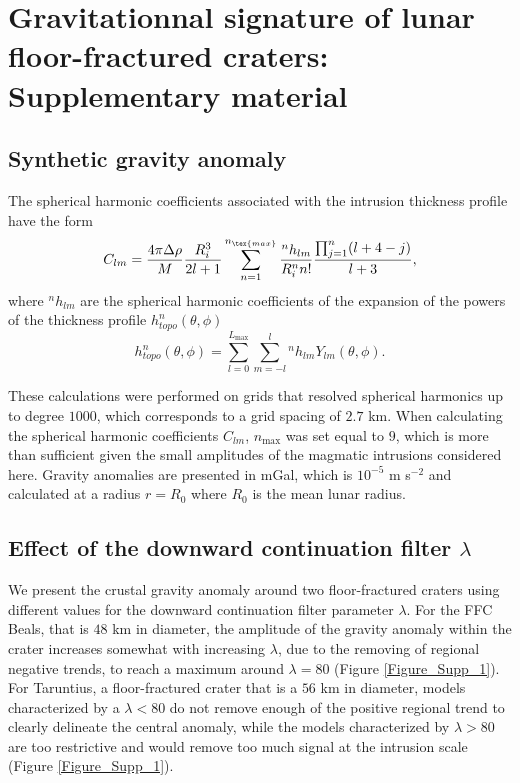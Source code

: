 \chapter{Gravitationnal  signature of  lunar floor-fractured  craters:
  Supplementary material}
\label{C6-chap:A5}

\section{Synthetic gravity anomaly}

The  spherical harmonic  coefficients  associated  with the  intrusion
thickness profile have the form
\begin{equation}
  C_{lm}=\frac{4\pi \Delta \rho}{M}\frac{R_i^3}{2l +1}\sum^{n_{\tex{max}}}_{n=1}\frac{^nh_{lm}}{R_i^n n!}\frac{\prod^n_{j=1}(l+4-j)}{l+3},
\end{equation}
where  $^nh_{lm}$  are  the  spherical harmonic  coefficients  of  the
expansion    of    the    powers     of    the    thickness    profile
$h_{topo}^n(\theta,\phi)$
\begin{equation}
  h^n_{topo}(\theta,\phi)= \sum_{l=0}^{L_{\text{max}}}\sum_{m=-l}^{l}{^n}h_{lm}Y_{lm}(\theta,\phi).
\end{equation}

These  calculations were  performed on  grids that  resolved spherical
harmonics up to degree $1000$, which  corresponds to a grid spacing of
$2.7$  km.   When  calculating  the  spherical  harmonic  coefficients
$C_{lm}$, $n_{\text{max}}$  was set equal  to $9$, which is  more than
sufficient  given  the small  amplitudes  of  the magmatic  intrusions
considered here.  Gravity anomalies  are presented  in mGal,  which is
$10^{-5}$ m s$^{-2}$ and calculated at a radius $r=R_0$ where $R_0$ is
the mean lunar radius.

\section{Effect of the downward continuation filter $\lambda$}
  
We  present the  crustal  gravity anomaly  around two  floor-fractured
craters using  different values  for the downward  continuation filter
parameter $\lambda$.  For the FFC Beals,  that is $48$ km in diameter,
the  amplitude of  the  gravity anomaly  within  the crater  increases
somewhat with  increasing $\lambda$, due  to the removing  of regional
negative  trends, to  reach a  maximum around  $\lambda =  80$ (Figure
\ref{Figure_Supp_1}). For Taruntius, a  floor-fractured crater that is
a $56$ km  in diameter, models characterized by a  $\lambda<80$ do not
remove enough of the positive  regional trend to clearly delineate the
central anomaly,  while the  models characterized by  $\lambda>80$ are
too  restrictive and  would remove  too much  signal at  the intrusion
scale (Figure \ref{Figure_Supp_1}).

